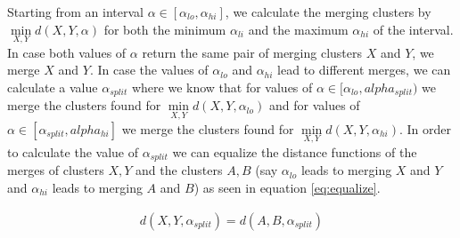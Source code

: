 \begin{algorithm}[H]
    \caption{We calculate all from splits resulting different intervals between $\alpha_{lo}$ and $\alpha_{hi}$, merge the resulting clusters and do so until each state contains only one cluster with all points.}
    \label{alg:alphalinkage1}
\end{algorithm}

Starting from an interval $\alpha \in [\alpha_{lo}, \alpha_{hi}]$, we calculate the merging clusters by $\min\limits_{X, Y} d(X,Y,\alpha)$ for both the minimum $\alpha_{li}$ and the maximum $\alpha_{hi}$ of the interval. In case both values of $\alpha$ return the same pair of merging clusters $X$ and $Y$, we merge $X$ and $Y$. In case the values of $\alpha_{lo}$ and $\alpha_{hi}$ lead to different merges, we can calculate a value $\alpha_{split}$ where we know that for values of $\alpha \in [\alpha_{lo}, alpha_{split})$ we merge the clusters found for $\min\limits_{X, Y} d(X,Y,\alpha_{lo})$ and for values of $\alpha \in [\alpha_{split}, alpha_{hi}]$ we merge the clusters found for $\min\limits_{X, Y} d(X,Y,\alpha_{hi})$. In order to calculate the value of $\alpha_{split}$ we can equalize the distance functions of the merges of clusters $X, Y$ and the clusters $A, B$ (say $\alpha_{lo}$ leads to merging $X$ and $Y$ and $\alpha_{hi}$ leads to merging $A$ and $B$) as seen in equation \ref{eq:equalize}. 

\begin{equation}
    \begin{aligned}
        d(X,Y,\alpha_{split}) = d(A,B,\alpha_{split})
    \end{aligned}
    \label{eq:equalize}
\end{equation}

